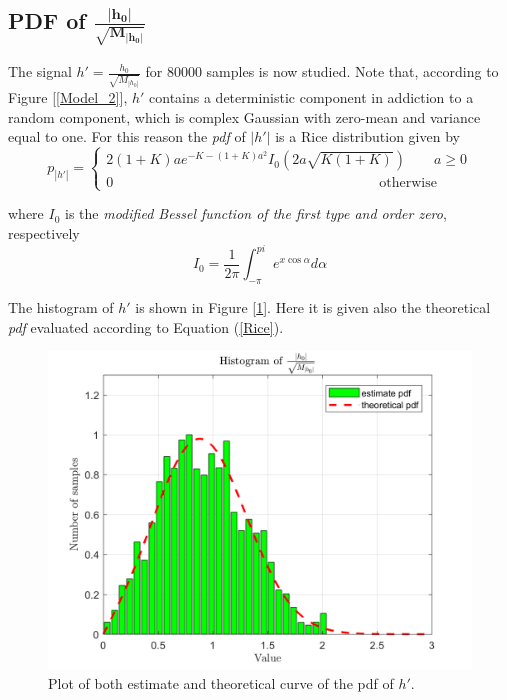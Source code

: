 \documentclass[a4paper, 12pt]{report}
\begin{document}
\clearpage
\subsection*{PDF of $\mathbf{\frac{|h_0|}{\sqrt{M_{|h_0|}}}}$}
The signal $h' = \frac{h_0}{\sqrt{M_{|h_0|}}} $ for 80000 samples is now studied. Note that, according to Figure [\ref{Model_2}], $h'$ contains a deterministic component in addiction to a random component, which is complex Gaussian with zero-mean and variance equal to one. For this reason the \textit{pdf} of $|h'|$ is a Rice distribution given by
\begin{equation}\label{Rice}
p_{|h'|} = \begin{cases*}
			2(1+K)ae^{-K-(1+K)a^2}I_0(2a\sqrt{K(1+K)}) \quad\quad a\ge0 \\
			0 \quad\quad\quad\quad\quad\quad\quad\quad\quad\quad\quad\quad\quad\quad\quad\quad\quad\quad\quad \text{otherwise}
\end{cases*}
\end{equation}

where $I_0$ is the \textit{modified Bessel function of the first type and order zero}, respectively
\begin{equation*}
I_0 = \frac{1}{2\pi}\int_{-\pi}^{pi}e^{x \cos \alpha}d\alpha
\end{equation*}

The histogram of $h'$ is shown in Figure [\ref{hist}]. Here it is given also the theoretical \textit{pdf} evaluated according to Equation (\ref{Rice}).

\begin{figure}[H]
	\centering
	\includegraphics[width=14cm]{images/hist}
	\caption{Plot of both estimate and theoretical curve of the pdf of $h'$.}\label{hist}
\end{figure}
\end{document}
